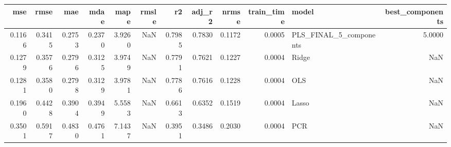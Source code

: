 \begin{tabular}{rrrrrrrrrrlr}
\toprule
mse & rmse & mae & mdae & mape & rmsle & r2 & adj_r2 & nrmse & train_time & model & best_components \\
\midrule
0.1166 & 0.3415 & 0.2753 & 0.2370 & 3.9260 & NaN & 0.7985 & 0.7830 & 0.1172 & 0.0005 & PLS_FINAL_5_components & 5.0000 \\
0.1279 & 0.3576 & 0.2796 & 0.3125 & 3.9749 & NaN & 0.7791 & 0.7621 & 0.1227 & 0.0004 & Ridge & NaN \\
0.1281 & 0.3580 & 0.2798 & 0.3129 & 3.9781 & NaN & 0.7786 & 0.7616 & 0.1228 & 0.0004 & OLS & NaN \\
0.1960 & 0.4428 & 0.3904 & 0.3949 & 5.5583 & NaN & 0.6613 & 0.6352 & 0.1519 & 0.0004 & Lasso & NaN \\
0.3501 & 0.5917 & 0.4830 & 0.4761 & 7.1437 & NaN & 0.3951 & 0.3486 & 0.2030 & 0.0004 & PCR & NaN \\
\bottomrule
\end{tabular}
